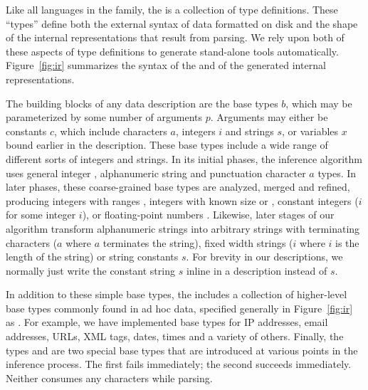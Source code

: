 Like all languages in the \pads{} family, the \ir{} is a collection of
type definitions.  These ``types'' define both the external syntax of
data formatted on disk and the shape of the internal representations
that result from parsing.  We rely upon both of these aspects of type
definitions to generate stand-alone tools automatically.
Figure~\ref{fig:ir} summarizes the syntax of the \ir{} and of the
generated internal representations. 

The building blocks of any \ir{} data description are the base types $b$,
which may be parameterized by some number of arguments $p$.  Arguments
may either be constants $c$, which include characters $a$, integers
$i$ and strings $s$, or variables $x$ bound earlier in the description.
These base types include a wide range of different sorts of
integers and strings.  In its initial phases, the inference algorithm
uses general integer , alphanumeric string 
and punctuation character $a$\cd{)} types.  In later phases,
these coarse-grained base types are analyzed, merged and refined, producing
integers with ranges ,
integers with known size  or , constant integers
($i$\cd{)} for some integer $i$), or floating-point
numbers .  Likewise, later stages of our algorithm transform
alphanumeric strings into arbitrary strings with terminating characters
($a$\cd{)} where $a$ terminates the string), fixed width
strings ($i$\cd{)} where $i$ is the length of the string) 
or string constants $s$\cd{)}.  For brevity in
our descriptions, we normally just write the constant string $s$
inline in a description instead of $s$\cd{)}.

In addition to these simple base types, the \ir{} includes a
collection of higher-level base types commonly found in ad hoc data,
specified generally in Figure~\ref{fig:ir} as .  For
example, we have implemented base types for IP addresses, email
addresses, URLs, XML tags, dates, times and a variety of
others. Finally, the types  and  are two special
base types that are introduced at various points in the inference
process.  The first fails immediately; the second succeeds
immediately.  Neither consumes any characters while parsing.

